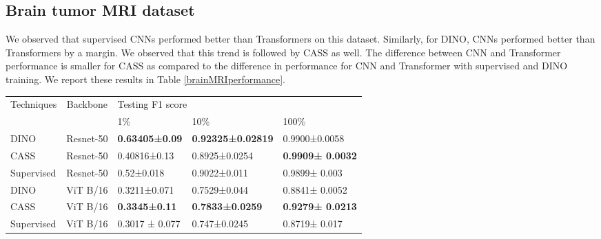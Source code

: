 \subsection{Brain tumor MRI dataset}

We observed that supervised CNNs performed better than Transformers on this dataset. Similarly, for DINO, CNNs performed better than Transformers by a margin. We observed that this trend is followed by CASS as well. The difference between CNN and Transformer performance is smaller for CASS as compared to the difference in performance for CNN and Transformer with supervised and DINO training. We report these results in Table \ref{brainMRIperformance}.
\begin{table*}[t]
\centering
\begin{tabular}{lllll}
\hline
\multicolumn{1}{c}{\multirow{2}{*}{Techniques}} & \multicolumn{1}{c}{\multirow{2}{*}{Backbone}} & \multicolumn{3}{l}{Testing F1 score} \\
\multicolumn{1}{c}{}                            & \multicolumn{1}{c}{}                           & 1\%       & 10\%       & 100\%       \\
\hline
DINO                                            & Resnet-50                                      &\textbf{0.63405±0.09}          &\textbf{0.92325±0.02819}            & 0.9900±0.0058          \\
CASS                                           & Resnet-50                                      & 0.40816±0.13          & 0.8925±0.0254          &\textbf{0.9909±
0.0032}
             \\
Supervised                                      & Resnet-50                                      &0.52±0.018          &0.9022±0.011            & 0.9899± 0.003            \\
\hline
DINO                                            & ViT B/16                                          &0.3211±0.071      &0.7529±0.044           &0.8841±
0.0052
           \\
CASS                                           & ViT B/16                                           & \textbf{0.3345±0.11}          & \textbf{0.7833±0.0259}           &\textbf{0.9279± 
0.0213}
             \\
Supervised                                      & ViT B/16                                           & 0.3017 ± 0.077         & 0.747±0.0245           & 0.8719± 0.017           \\
\hline
\end{tabular}
\caption{While DINO outperformed CASS for 1\% and 10\% labeled training for CNN, CASS maintained its superiority for 100\% labeled training, albeit by just 0.09\%. Similarly, CASS outperformed DINO for all data regimes for Transformers, incrementally 1.34\% in for 1\%, 3.04\% for 10\%, and 4.38\% for 100\% labeled training. We observe that this margin is more significant than for biopsy images. Such results could be ascribed to the increase in dataset size and increasing learnable information.}
\label{brainMRIperformance}
\end{table*}


